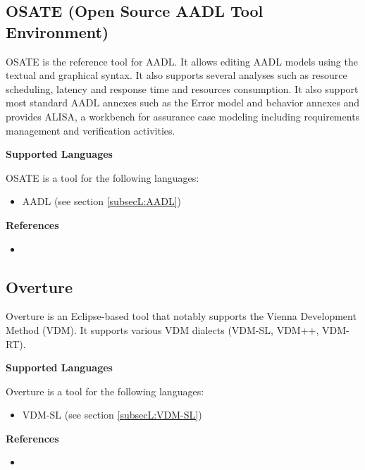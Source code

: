 \subsection{OSATE (Open Source AADL Tool Environment)}
\label{subsecT:OSATE}


OSATE is the reference tool for AADL. It allows editing AADL models using the textual and graphical syntax. It also supports several analyses such as resource scheduling, latency and response time and resources consumption. It also support most standard AADL annexes such as the Error model and behavior annexes and provides ALISA, a workbench for assurance case modeling including requirements management and verification activities.

\textbf{Supported Languages}

OSATE is a tool for the following languages:
\begin{itemize}
	\item AADL (see section \ref{subsecL:AADL})
\end{itemize}


\textbf{References}
\begin{itemize}
	
\item {}
\end{itemize}



\subsection{Overture}
\label{subsecT:Overture}


Overture is an Eclipse-based tool that notably supports the Vienna Development Method (VDM). It supports various VDM dialects (VDM-SL, VDM++, VDM-RT).

\textbf{Supported Languages}

Overture is a tool for the following languages:
\begin{itemize}
	\item VDM-SL (see section \ref{subsecL:VDM-SL})
\end{itemize}


\textbf{References}
\begin{itemize}
	
\item {}
\end{itemize}



